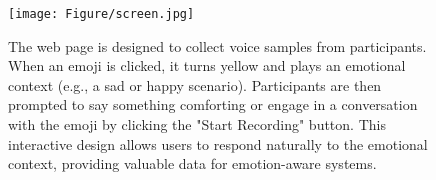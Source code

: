 \begin{figure}[ht]
\centering
  \texttt{[image: Figure/screen.jpg]}
  \caption{The web page is designed to collect voice samples from participants. When an emoji is clicked, it turns yellow and plays an emotional context (e.g., a sad or happy scenario). Participants are then prompted to say something comforting or engage in a conversation with the emoji by clicking the "Start Recording" button. This interactive design allows users to respond naturally to the emotional context, providing valuable data for emotion-aware systems.}\label{fig:webpage}
  \vspace{-1em}
\end{figure} 


